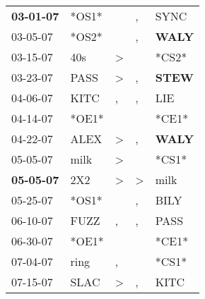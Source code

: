 \begin{supertabular}{p{0.07\textwidth}p{0.06\textwidth}p{0.02\textwidth}p{0.02\textwidth}p{0.06\textwidth}}
 \textbf{03-01-07\textsuperscript{}} &                            *OS1* &                  &                , &           SYNC\textsuperscript{} \\
          03-05-07\textsuperscript{} &                            *OS2* &                  &                , &  \textbf{WALY\textsuperscript{}} \\
          03-15-07\textsuperscript{} &            40s\textsuperscript{} &     \textgreater &                  &                            *CS2* \\
          03-23-07\textsuperscript{} &           PASS\textsuperscript{} &     \textgreater &                , &  \textbf{STEW\textsuperscript{}} \\
          04-06-07\textsuperscript{} &           KITC\textsuperscript{} &                , &                , &            LIE\textsuperscript{} \\
          04-14-07\textsuperscript{} &                            *OE1* &                  &                  &                            *CE1* \\
          04-22-07\textsuperscript{} &           ALEX\textsuperscript{} &     \textgreater &                , &  \textbf{WALY\textsuperscript{}} \\
          05-05-07\textsuperscript{} &           milk\textsuperscript{} &     \textgreater &                  &                            *CS1* \\
 \textbf{05-05-07\textsuperscript{}} &            2X2\textsuperscript{} &     \textgreater &     \textgreater &           milk\textsuperscript{} \\
          05-25-07\textsuperscript{} &                            *OS1* &                  &                , &           BILY\textsuperscript{} \\
          06-10-07\textsuperscript{} &           FUZZ\textsuperscript{} &                , &                , &           PASS\textsuperscript{} \\
          06-30-07\textsuperscript{} &                            *OE1* &                  &                  &                            *CE1* \\
          07-04-07\textsuperscript{} &           ring\textsuperscript{} &                , &                  &                            *CS1* \\
          07-15-07\textsuperscript{} &           SLAC\textsuperscript{} &     \textgreater &                , &           KITC\textsuperscript{} \\

\end{supertabular}
